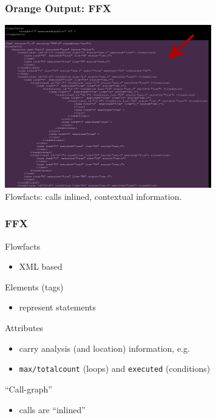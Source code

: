\documentclass{beamer}
\begin{document}
\begin{frame}[fragile]
  \frametitle{Orange Output: FFX}

  \begin{center}
    \includegraphics[width=9cm]{img/the_ffx.pdf} \\
    Flowfacts: calls inlined, contextual information.
  \end{center}
\end{frame} 



\begin{frame}[fragile]
  \frametitle{FFX}

  \medskip
  Flowfacts
  \begin{itemize}
    \item XML based
  \end{itemize}

  \medskip
  Elements (tags)
  \begin{itemize}
    \item represent statements
  \end{itemize}

  \medskip
  Attributes
  \begin{itemize}
    \item carry analysis (and location) information, e.g.~
    \item {\tt max/totalcount} (loops) and {\tt executed} (conditions)
  \end{itemize}

  \medskip
  ``Call-graph''
  \begin{itemize}
    \item calls are ``inlined''
  \end{itemize}
\end{frame} 
\end{document}

